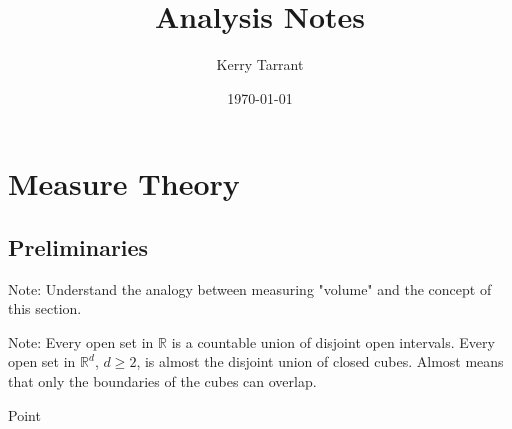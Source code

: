 \documentclass{book}
\title{Analysis Notes}
\author{Kerry Tarrant}
\date\today
\begin{document}
\maketitle
\tableofcontents{}


\chapter{Measure Theory}

\section{Preliminaries}
Note: Understand the analogy between measuring "volume" and the concept of this section.

Note: Every open set in $\mathbb{R}$ is a countable union of disjoint open intervals. Every open set in $\mathbb{R}^{d}$, $d\geq 2$, is almost the disjoint union of closed cubes. Almost means that only the boundaries of the cubes can overlap.


Point
\end{document}
